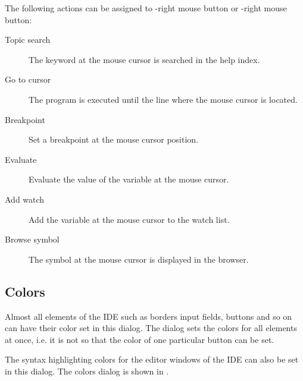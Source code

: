 The following actions can be assigned to -right mouse button or
-right mouse button:
\begin{description}
\item [Topic search] The keyword at the mouse cursor is searched in the
help index.
\item [Go to cursor] The program is executed until the line where
the mouse cursor is located.
\item [Breakpoint] Set a breakpoint at the mouse cursor position.
\item [Evaluate] Evaluate the value of the variable at the mouse
cursor.
\item [Add watch] Add the variable at the mouse cursor to the
watch list.
\item [Browse symbol] The symbol at the mouse cursor is displayed
in the browser.
\end{description}

%
%
\subsection{Colors}
\label{se:prefcolors}
Almost all elements of the IDE such as borders input fields, buttons and so
on can have their color set in this dialog. The dialog sets the colors for
all elements at once, i.e. it is not so that the color of one particular
button can be set.

The syntax highlighting colors for the editor windows of the IDE can also 
be set in this dialog.
The colors dialog is shown in .


